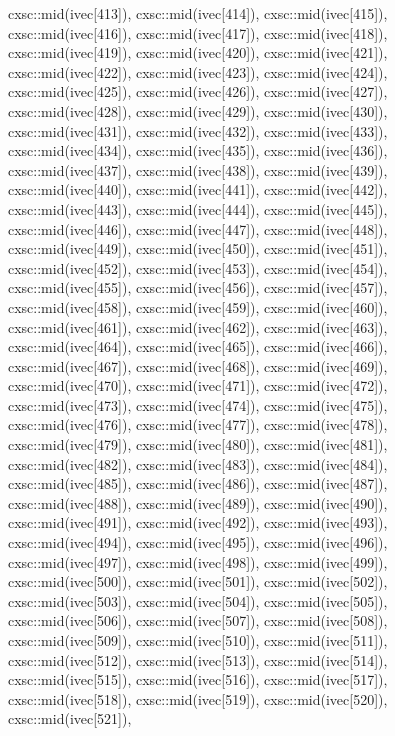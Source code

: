 \begin{DoxyCode}
{  cxsc::mid(ivec[413]),
  cxsc::mid(ivec[414]),
  cxsc::mid(ivec[415]),
  cxsc::mid(ivec[416]),
  cxsc::mid(ivec[417]),
  cxsc::mid(ivec[418]),
  cxsc::mid(ivec[419]),
  cxsc::mid(ivec[420]),
  cxsc::mid(ivec[421]),
  cxsc::mid(ivec[422]),
  cxsc::mid(ivec[423]),
  cxsc::mid(ivec[424]),
  cxsc::mid(ivec[425]),
  cxsc::mid(ivec[426]),
  cxsc::mid(ivec[427]),
  cxsc::mid(ivec[428]),
  cxsc::mid(ivec[429]),
  cxsc::mid(ivec[430]),
  cxsc::mid(ivec[431]),
  cxsc::mid(ivec[432]),
  cxsc::mid(ivec[433]),
  cxsc::mid(ivec[434]),
  cxsc::mid(ivec[435]),
  cxsc::mid(ivec[436]),
  cxsc::mid(ivec[437]),
  cxsc::mid(ivec[438]),
  cxsc::mid(ivec[439]),
  cxsc::mid(ivec[440]),
  cxsc::mid(ivec[441]),
  cxsc::mid(ivec[442]),
  cxsc::mid(ivec[443]),
  cxsc::mid(ivec[444]),
  cxsc::mid(ivec[445]),
  cxsc::mid(ivec[446]),
  cxsc::mid(ivec[447]),
  cxsc::mid(ivec[448]),
  cxsc::mid(ivec[449]),
  cxsc::mid(ivec[450]),
  cxsc::mid(ivec[451]),
  cxsc::mid(ivec[452]),
  cxsc::mid(ivec[453]),
  cxsc::mid(ivec[454]),
  cxsc::mid(ivec[455]),
  cxsc::mid(ivec[456]),
  cxsc::mid(ivec[457]),
  cxsc::mid(ivec[458]),
  cxsc::mid(ivec[459]),
  cxsc::mid(ivec[460]),
  cxsc::mid(ivec[461]),
  cxsc::mid(ivec[462]),
  cxsc::mid(ivec[463]),
  cxsc::mid(ivec[464]),
  cxsc::mid(ivec[465]),
  cxsc::mid(ivec[466]),
  cxsc::mid(ivec[467]),
  cxsc::mid(ivec[468]),
  cxsc::mid(ivec[469]),
  cxsc::mid(ivec[470]),
  cxsc::mid(ivec[471]),
  cxsc::mid(ivec[472]),
  cxsc::mid(ivec[473]),
  cxsc::mid(ivec[474]),
  cxsc::mid(ivec[475]),
  cxsc::mid(ivec[476]),
  cxsc::mid(ivec[477]),
  cxsc::mid(ivec[478]),
  cxsc::mid(ivec[479]),
  cxsc::mid(ivec[480]),
  cxsc::mid(ivec[481]),
  cxsc::mid(ivec[482]),
  cxsc::mid(ivec[483]),
  cxsc::mid(ivec[484]),
  cxsc::mid(ivec[485]),
  cxsc::mid(ivec[486]),
  cxsc::mid(ivec[487]),
  cxsc::mid(ivec[488]),
  cxsc::mid(ivec[489]),
  cxsc::mid(ivec[490]),
  cxsc::mid(ivec[491]),
  cxsc::mid(ivec[492]),
  cxsc::mid(ivec[493]),
  cxsc::mid(ivec[494]),
  cxsc::mid(ivec[495]),
  cxsc::mid(ivec[496]),
  cxsc::mid(ivec[497]),
  cxsc::mid(ivec[498]),
  cxsc::mid(ivec[499]),
  cxsc::mid(ivec[500]),
  cxsc::mid(ivec[501]),
  cxsc::mid(ivec[502]),
  cxsc::mid(ivec[503]),
  cxsc::mid(ivec[504]),
  cxsc::mid(ivec[505]),
  cxsc::mid(ivec[506]),
  cxsc::mid(ivec[507]),
  cxsc::mid(ivec[508]),
  cxsc::mid(ivec[509]),
  cxsc::mid(ivec[510]),
  cxsc::mid(ivec[511]),
  cxsc::mid(ivec[512]),
  cxsc::mid(ivec[513]),
  cxsc::mid(ivec[514]),
  cxsc::mid(ivec[515]),
  cxsc::mid(ivec[516]),
  cxsc::mid(ivec[517]),
  cxsc::mid(ivec[518]),
  cxsc::mid(ivec[519]),
  cxsc::mid(ivec[520]),
  cxsc::mid(ivec[521]),
}
\end{DoxyCode}
